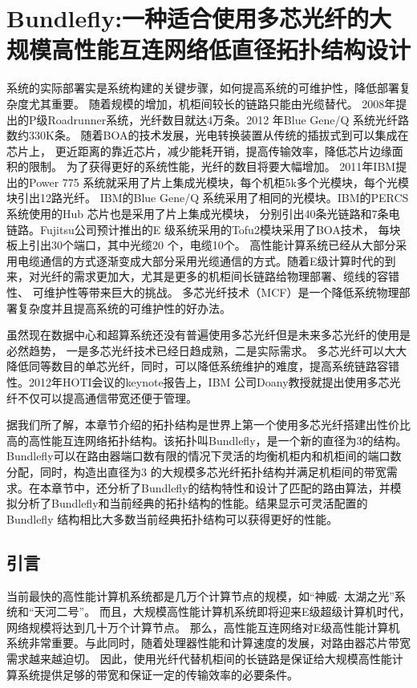 \chapter{Bundlefly:一种适合使用多芯光纤的大规模高性能互连网络低直径拓扑结构设计}
系统的实际部署实是系统构建的关键步骤，如何提高系统的可维护性，降低部署复杂度尤其重要。
随着规模的增加，机柜间较长的链路只能由光缆替代。
2008年提出的P级Roadrunner系统，光纤数目就达4万条。2012 年Blue Gene/Q 系统光纤路数约330K条。
随着BOA的技术发展，光电转换装置从传统的插拔式到可以集成在芯片上，
更近距离的靠近芯片，减少能耗开销，提高传输效率，降低芯片边缘面积的限制。
为了获得更好的系统性能，光纤的数目将要大幅增加。
2011年IBM提出的Power 775 系统就采用了片上集成光模块，每个机柜5k多个光模块，每个光模块引出12路光纤。
IBM的Blue Gene/Q 系统采用了相同的光模块。IBM的PERCS 系统使用的Hub 芯片也是采用了片上集成光模块，
分别引出40条光链路和7条电链路。Fujitsu公司预计推出的E 级系统采用的Tofu2模块采用了BOA技术，
每块板上引出30个端口，其中光缆20 个，电缆10个。
高性能计算系统已经从大部分采用电缆通信的方式逐渐变成大部分采用光缆通信的方式。随着E级计算时代的到来，对光纤的需求更加大，尤其是更多的机柜间长链路给物理部署、缆线的容错性、
可维护性等带来巨大的挑战。
多芯光纤技术（MCF）是一个降低系统物理部署复杂度并且提高系统的可维护性的好办法。

虽然现在数据中心和超算系统还没有普遍使用多芯光纤但是未来多芯光纤的使用是必然趋势，
一是多芯光纤技术已经日趋成熟，二是实际需求。
多芯光纤可以大大降低同等数目的单芯光纤，同时，可以降低系统维护的难度，提高系统链路容错性。2012年HOTI会议的keynote报告上，IBM 公司Doany教授就提出使用多芯光纤不仅可以提高通信带宽还便于管理。

据我们所了解，本章节介绍的拓扑结构是世界上第一个使用多芯光纤搭建出性价比高的高性能互连网络拓扑结构。该拓扑叫Bundlefly，是一个新的直径为3的结构。Bundlefly可以在路由器端口数有限的情况下灵活的均衡机柜内和机柜间的端口数分配，同时，构造出直径为3 的大规模多芯光纤拓扑结构并满足机柜间的带宽需求。在本章节中，还分析了Bundlefly的结构特性和设计了匹配的路由算法，并模拟分析了Bundlefly和当前经典的拓扑结构的性能。结果显示可灵活配置的Bundlefly 结构相比大多数当前经典拓扑结构可以获得更好的性能。

\section{引言}

当前最快的高性能计算机系统都是几万个计算节点的规模，如“神威$\cdot$ 太湖之光”系统和“天河二号”。
而且，大规模高性能计算机系统即将迎来E级超级计算机时代，网络规模将达到几十万个计算节点。
那么，高性能互连网络对E级高性能计算机系统非常重要。与此同时，随着处理器性能和计算速度的发展，对路由器芯片带宽需求越来越迫切。
因此，使用光纤代替机柜间的长链路是保证给大规模高性能计算系统提供足够的带宽和保证一定的传输效率的必要条件。

